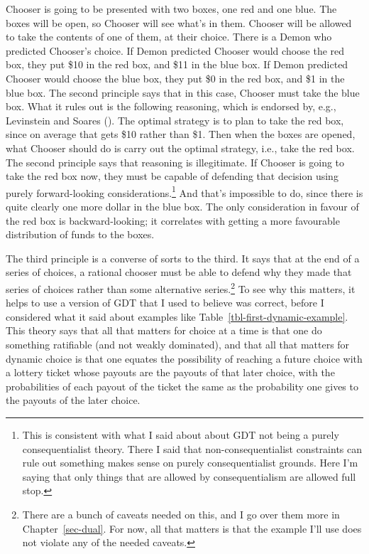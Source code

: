\documentclass[
  12pt,
  letterpaper,
  DIV=11,
  numbers=noendperiod]{scrreprt}
\begin{document}
Chooser is going to be presented with two boxes, one red and one blue.
The boxes will be open, so Chooser will see what's in them. Chooser will
be allowed to take the contents of one of them, at their choice. There
is a Demon who predicted Chooser's choice. If Demon predicted Chooser
would choose the red box, they put \$10 in the red box, and \$11 in the
blue box. If Demon predicted Chooser would choose the blue box, they put
\$0 in the red box, and \$1 in the blue box. The second principle says
that in this case, Chooser must take the blue box. What it rules out is
the following reasoning, which is endorsed by, e.g., Levinstein and
Soares (). The optimal strategy
is to plan to take the red box, since on average that gets \$10 rather
than \$1. Then when the boxes are opened, what Chooser should do is
carry out the optimal strategy, i.e., take the red box. The second
principle says that reasoning is illegitimate. If Chooser is going to
take the red box now, they must be capable of defending that decision
using purely forward-looking considerations.\footnote{This is consistent
  with what I said about about GDT not being a purely consequentialist
  theory. There I said that non-consequentialist constraints can rule
  out something makes sense on purely consequentialist grounds. Here I'm
  saying that only things that are allowed by consequentialism are
  allowed full stop.} And that's impossible to do, since there is quite
clearly one more dollar in the blue box. The only consideration in
favour of the red box is backward-looking; it correlates with getting a
more favourable distribution of funds to the boxes.

The third principle is a converse of sorts to the third. It says that at
the end of a series of choices, a rational chooser must be able to
defend why they made that series of choices rather than some alternative
series.\footnote{There are a bunch of caveats needed on this, and I go
  over them more in Chapter~\ref{sec-dual}. For now, all that matters is
  that the example I'll use does not violate any of the needed caveats.}
To see why this matters, it helps to use a version of GDT that I used to
believe was correct, before I considered what it said about examples
like Table~\ref{tbl-first-dynamic-example}. This theory says that all
that matters for choice at a time is that one do something ratifiable
(and not weakly dominated), and that all that matters for dynamic choice
is that one equates the possibility of reaching a future choice with a
lottery ticket whose payouts are the payouts of that later choice, with
the probabilities of each payout of the ticket the same as the
probability one gives to the payouts of the later choice.
\end{document}

